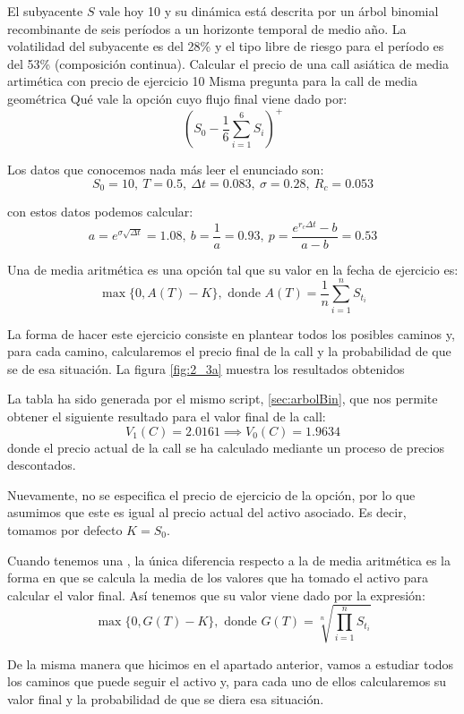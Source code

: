 \begin{problem}[3]
El subyacente $S$ vale hoy 10 y su dinámica está descrita por un árbol binomial recombinante de seis períodos a un horizonte temporal de medio año. La volatilidad del subyacente es del 28\% y el tipo libre de riesgo para el período es del 53\% (composición continua).
\ppart Calcular el precio de una call asiática de media artimética con precio de ejercicio 10
\ppart Misma pregunta para la call de media geométrica
\ppart Qué vale la opción cuyo flujo final viene dado por:
\[(S_0-\frac{1}{6}\sum_{i=1}^6S_i)^+\]
\solution



Los datos que conocemos nada más leer el enunciado son:
\[S_0=10, \ T=0.5, \ Δt = 0.083, \ σ=0.28, \ R_c=0.053\]

con estos datos podemos calcular:
\[a=e^{σ\sqrt{Δt}} = 1.08, \ b = \frac{1}{a} = 0.93, \ p = \frac{e^{r_cΔt}-b}{a-b}=0.53\]

\spart

Una  de media aritmética es una opción tal que su valor en la fecha de ejercicio es:
\[\max\{0, A(T)-K\}, \text{ donde } A(T) = \frac{1}{n} \sum_{i=1}^nS_{t_i}\]

La forma de hacer este ejercicio consiste en plantear todos los posibles caminos y, para cada camino, calcularemos el precio final de la call y la probabilidad de que se de esa situación. La figura \ref{fig:2_3a} muestra los resultados obtenidos

La tabla ha sido generada por el mismo script, \ref{sec:arbolBin}, que nos permite obtener el siguiente resultado para el valor final de la call:
\[V_1(C) = 2.0161 \implies V_0(C) = 1.9634\]
donde el precio actual de la call se ha calculado mediante un proceso de precios descontados.

\obs Nuevamente, no se especifica el precio de ejercicio de la opción, por lo que asumimos que este es igual al precio actual del activo asociado. Es decir, tomamos por defecto $K=S_0$.

\spart

Cuando tenemos una , la única diferencia respecto a la de media aritmética es la forma en que se calcula la media de los valores que ha tomado el activo para calcular el valor final. Así tenemos que su valor viene dado por la expresión:
\[\max\{0, G(T)-K\}, \text{ donde } G(T) = \sqrt[n]{\prod_{i=1}^nS_{t_i}}\]

De la misma manera que hicimos en el apartado anterior, vamos a estudiar todos los caminos que puede seguir el activo y, para cada uno de ellos calcularemos su valor final y la probabilidad de que se diera esa situación.


\end{problem}
